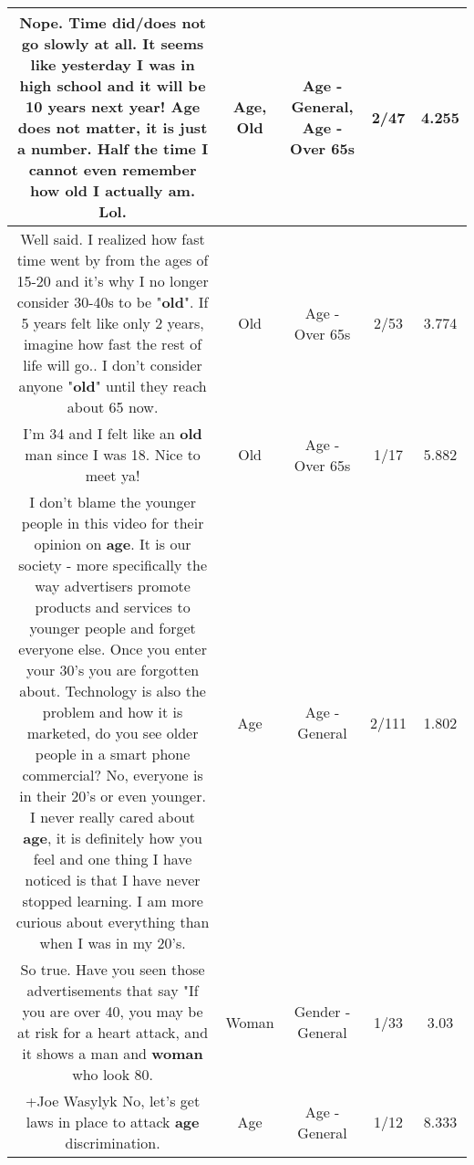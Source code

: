 \documentclass[11pt]{article}
\newlength\mylength
\begin{document}
\begin{center}
\begin{longtable}{|C{.65\mylength}|C{.30\mylength}|C{.12\mylength}|C{.12\mylength}|C{.12\mylength}|}
  \small Nope. Time did/does not go slowly at all. It seems like yesterday I was in high school and it will be 10 years next year! \textbf{Age} does not matter, it is just a number. Half the time I cannot even remember how \textbf{old} I actually am. Lol.\normalsize   & Age, Old & Age - General, Age - Over 65s & 2/47 & 4.255 \\  \hline
  \small Well said. I realized how fast time went by from the ages of 15-20 and it's why I no longer consider 30-40s to be "\textbf{old}". If 5 years felt like only 2 years, imagine how fast the rest of life will go.. I don't consider anyone "\textbf{old}" until they reach about 65 now.\normalsize   & Old & Age - Over 65s & 2/53 & 3.774 \\  \hline
  \small I'm 34 and I felt like an \textbf{old} man since I was 18. Nice to meet ya!\normalsize   & Old & Age - Over 65s & 1/17 & 5.882 \\  \hline
  \small I don't blame the younger people in this video for their opinion on \textbf{age}. It is our society - more specifically the way advertisers promote products and services to younger people and forget everyone else. Once you enter your 30's you are forgotten about. Technology is also the problem and how it is marketed, do you see older people in a smart phone commercial? No, everyone is in their 20's or even younger. I never really cared about \textbf{age}, it is definitely how you feel and one thing I have noticed is that I have never stopped learning. I am more curious about everything than when I was in my 20's.\normalsize   & Age & Age - General & 2/111 & 1.802 \\  \hline
  \small So true.  Have you seen those advertisements that say "If you are over 40, you may be at risk for a heart attack, and it shows a man and \textbf{woman} who look 80.\normalsize   & Woman & Gender - General & 1/33 & 3.03 \\  \hline
  \small +Joe Wasylyk No, let's get laws in place to attack \textbf{age} discrimination.\normalsize   & Age & Age - General & 1/12 & 8.333 \\  \hline

\end{longtable}
\end{center}
\end{document}
